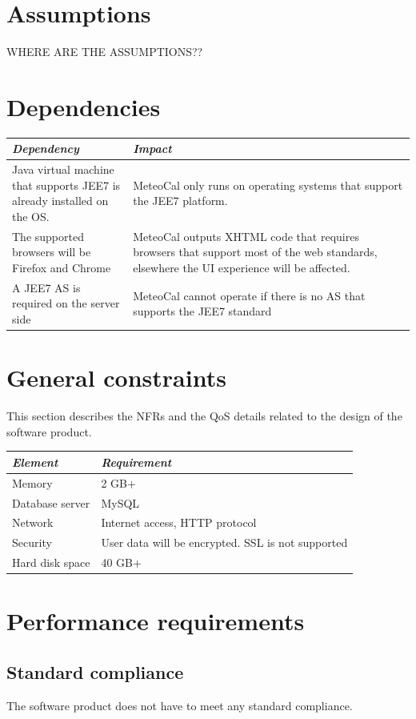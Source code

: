\documentclass[10pt,a4paper,titlepage]{article}
\begin{document}
\section{Assumptions}
WHERE ARE THE ASSUMPTIONS??

\section{Dependencies}
\begin{tabular}{| p{0.3\linewidth} | p{0.7\linewidth} |}
\hline	\emph{Dependency}	&	\emph{Impact}	\\
\hline	Java virtual machine that supports JEE7 is already installed on the OS. & MeteoCal only runs on operating systems that support the JEE7 platform.	\\
\hline	The supported browsers will be Firefox and Chrome & MeteoCal outputs XHTML code that requires browsers that support most of the web standards, elsewhere the UI experience will be affected.	\\
\hline	A JEE7 AS is required on the server side	&	MeteoCal cannot operate if there is no AS that supports the JEE7 standard	\\
\hline
\end{tabular}

\section{General constraints}
This section describes the NFRs and the QoS details related to the design of the software product.

\noindent\begin{tabular}{| l | l |}
\hline	\emph{Element}	&	\emph{Requirement}	\\
\hline	Memory			&	2 GB+				\\
\hline	Database server	&	MySQL				\\
\hline	Network			&	Internet access, HTTP protocol	\\
\hline	Security		&	User data will be encrypted. SSL is not supported	\\
\hline	Hard disk space	&	40 GB+				\\
\hline
\end{tabular}

\section{Performance requirements}
\subsection{Standard compliance}
The software product does not have to meet any standard compliance.
\end{document}
